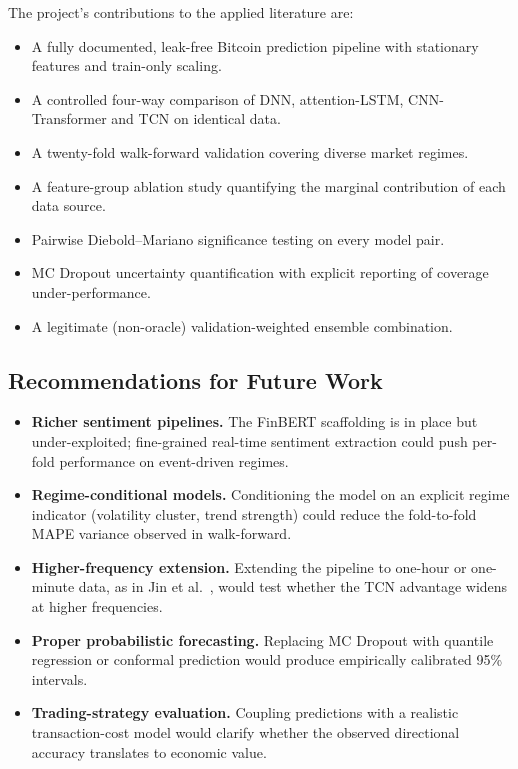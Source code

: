 \documentclass[12pt]{article}
\begin{document}
The project's contributions to the applied literature are:
\begin{itemize}[leftmargin=*]
    \item A fully documented, leak-free Bitcoin prediction pipeline with stationary features and train-only scaling.
    \item A controlled four-way comparison of DNN, attention-LSTM, CNN-Transformer and TCN on identical data.
    \item A twenty-fold walk-forward validation covering diverse market regimes.
    \item A feature-group ablation study quantifying the marginal contribution of each data source.
    \item Pairwise Diebold--Mariano significance testing on every model pair.
    \item MC Dropout uncertainty quantification with explicit reporting of coverage under-performance.
    \item A legitimate (non-oracle) validation-weighted ensemble combination.
\end{itemize}

\subsection{Recommendations for Future Work}

\begin{itemize}[leftmargin=*]
    \item \textbf{Richer sentiment pipelines.} The FinBERT scaffolding is in place but under-exploited; fine-grained real-time sentiment extraction could push per-fold performance on event-driven regimes.
    \item \textbf{Regime-conditional models.} Conditioning the model on an explicit regime indicator (volatility cluster, trend strength) could reduce the fold-to-fold MAPE variance observed in walk-forward.
    \item \textbf{Higher-frequency extension.} Extending the pipeline to one-hour or one-minute data, as in Jin et al.\ \cite{jin2025tcn}, would test whether the TCN advantage widens at higher frequencies.
    \item \textbf{Proper probabilistic forecasting.} Replacing MC Dropout with quantile regression or conformal prediction would produce empirically calibrated 95\% intervals.
    \item \textbf{Trading-strategy evaluation.} Coupling predictions with a realistic transaction-cost model would clarify whether the observed directional accuracy translates to economic value.
\end{itemize}
\end{document}
